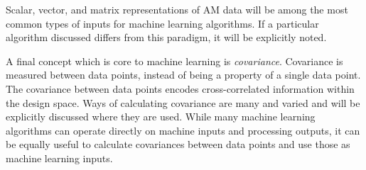 Scalar, vector, and matrix representations of AM data will be among the most common types of inputs for machine learning algorithms. If a particular algorithm discussed differs from this paradigm, it will be explicitly noted. 

A final concept which is core to machine learning is \textit{covariance}. Covariance is measured between data points, instead of being a property of a single data point. The covariance between data points encodes cross-correlated information within the design space. Ways of calculating covariance are many and varied and will be explicitly discussed where they are used. While many machine learning algorithms can operate directly on machine inputs and processing outputs, it can be equally useful to calculate covariances between data points and use those as machine learning inputs.